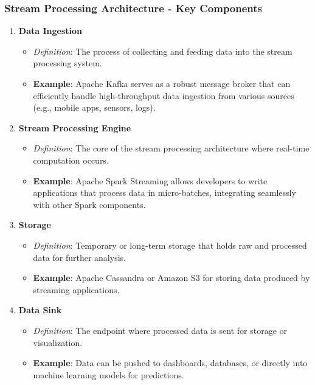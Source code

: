 \documentclass[aspectratio=169]{beamer}
\begin{document}
\begin{frame}[fragile]
    \frametitle{Stream Processing Architecture - Key Components}
    \begin{enumerate}
        \item \textbf{Data Ingestion}  
        \begin{itemize}
            \item \textit{Definition}: The process of collecting and feeding data into the stream processing system.
            \item \textbf{Example}: Apache Kafka serves as a robust message broker that can efficiently handle high-throughput data ingestion from various sources (e.g., mobile apps, sensors, logs).
        \end{itemize}
        
        \item \textbf{Stream Processing Engine}  
        \begin{itemize}
            \item \textit{Definition}: The core of the stream processing architecture where real-time computation occurs.
            \item \textbf{Example}: Apache Spark Streaming allows developers to write applications that process data in micro-batches, integrating seamlessly with other Spark components.
        \end{itemize}
        
        \item \textbf{Storage}  
        \begin{itemize}
            \item \textit{Definition}: Temporary or long-term storage that holds raw and processed data for further analysis.
            \item \textbf{Example}: Apache Cassandra or Amazon S3 for storing data produced by streaming applications.
        \end{itemize}
        
        \item \textbf{Data Sink}  
        \begin{itemize}
            \item \textit{Definition}: The endpoint where processed data is sent for storage or visualization.
            \item \textbf{Example}: Data can be pushed to dashboards, databases, or directly into machine learning models for predictions.
        \end{itemize}
    \end{enumerate}
\end{frame}
\end{document}
